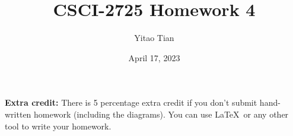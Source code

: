 \documentclass[12pt, a4paper]{article}
\title{CSCI-2725 Homework 4}
\author{Yitao Tian}
\date{April 17, 2023}
\begin{document}
\maketitle

\textbf{Extra credit:} There is 5 percentage extra credit if you don't submit hand-written homework (including the diagrams).
You can use \LaTeX\ or any other tool to write your homework.

\begin{enumerate}

    

\end{enumerate}
\end{document}
